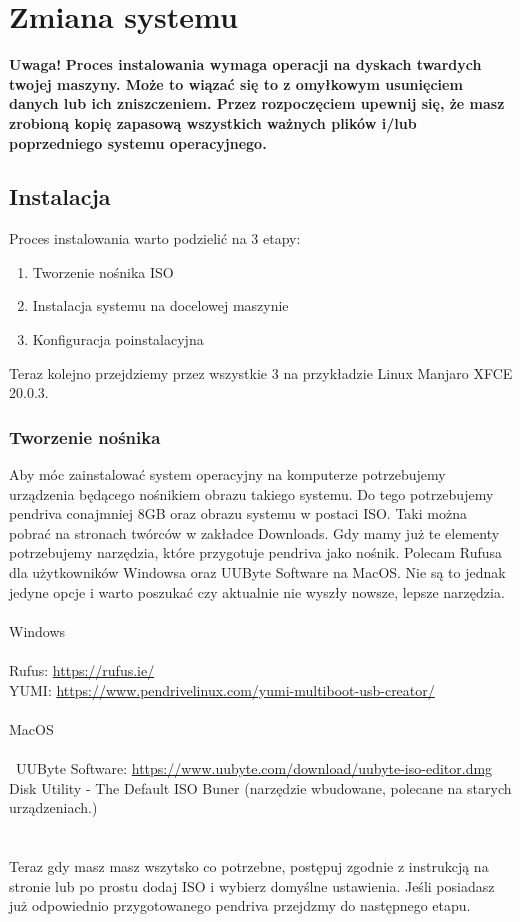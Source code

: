 \documentclass[10pt,a4paper]{report}
\begin{document}
\chapter{Zmiana systemu}

\textbf{Uwaga!} \textbf{Proces instalowania wymaga operacji na dyskach twardych twojej maszyny. Może to wiązać się to z omyłkowym usunięciem danych lub ich zniszczeniem. Przez rozpoczęciem upewnij się, że masz zrobioną kopię zapasową wszystkich ważnych plików i/lub poprzedniego systemu operacyjnego.}

	\section{Instalacja}
	
Proces instalowania warto podzielić na 3 etapy:
\begin{enumerate}
\item Tworzenie nośnika ISO
\item Instalacja systemu na docelowej maszynie
\item Konfiguracja poinstalacyjna\\
\end{enumerate}	
Teraz kolejno przejdziemy przez wszystkie 3 na przykładzie Linux Manjaro XFCE 20.0.3.

		\subsection{Tworzenie nośnika}

Aby móc zainstalować system operacyjny na komputerze potrzebujemy urządzenia będącego nośnikiem obrazu takiego systemu. Do tego potrzebujemy pendriva conajmniej 8GB oraz obrazu systemu w postaci ISO. Taki można pobrać na stronach twórców w zakładce Downloads. Gdy mamy już te elementy potrzebujemy narzędzia, które przygotuje pendriva jako nośnik. Polecam Rufusa dla użytkowników Windowsa oraz UUByte Software na MacOS. Nie są to jednak jedyne opcje i warto poszukać czy aktualnie nie wyszły nowsze, lepsze narzędzia.\\\\Windows\\\\Rufus: \url{https://rufus.ie/}\\ YUMI: \url{https://www.pendrivelinux.com/yumi-multiboot-usb-creator/}\\\\MacOS\\\\\ UUByte Software: \url{https://www.uubyte.com/download/uubyte-iso-editor.dmg}\\Disk Utility - The Default ISO Buner (narzędzie wbudowane, polecane na starych urządzeniach.)\\\\\\ Teraz gdy masz masz wszytsko co potrzebne, postępuj zgodnie z instrukcją na stronie lub po prostu dodaj ISO i wybierz domyślne ustawienia. Jeśli posiadasz już odpowiednio przygotowanego pendriva przejdzmy do następnego etapu.\\\\
		
\end{document}

